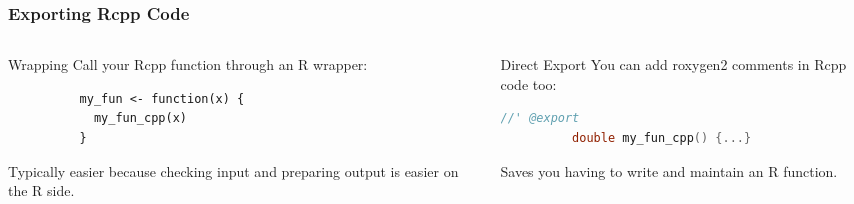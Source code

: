 \documentclass[aspectratio=1610,onlytextwidth]{beamer}
\begin{document}
\begin{frame}[c,fragile]
  \frametitle{Exporting Rcpp Code}
  \begin{columns}[T]
    \begin{column}{0.45\textwidth}
      \begin{block}{Wrapping}
        Call your Rcpp function through an R wrapper:
        \begin{lstlisting}
          my_fun <- function(x) {
            my_fun_cpp(x)
          }
        \end{lstlisting}

        \pause

        Typically easier because checking input and preparing output is
        easier on the R side.
      \end{block}
    \end{column}\pause
    \begin{column}{0.45\textwidth}
      \begin{block}{Direct Export}
        You can add roxygen2 comments in Rcpp code too:
        \begin{lstlisting}[language=C++]
          //' @export
          double my_fun_cpp() {...}
        \end{lstlisting}

        \pause

        Saves you having to write and maintain an R function.
      \end{block}
    \end{column}
  \end{columns}
\end{frame}
\end{document}
